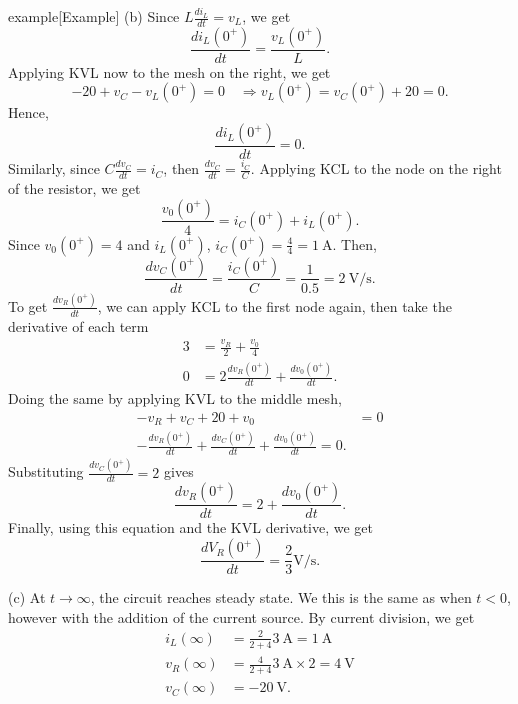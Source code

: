 \documentclass{article}
\begin{document}
\begin{callout}{example}[Example]
(b) Since $L \frac{d i_L}{d t}=v_L$, we get 
\[
    \frac{d i_L(0^+)}{d t}=\frac{v_L(0^+)}{L}.
\]
Applying KVL now to the mesh on the right, we get 
\[
    -20+v_C-v_L(0^+)=0\quad \Rightarrow v_L(0^+)=v_C(0^+)+20=0.
\]
Hence, 
\[
    \frac{d i_L(0^+)}{d t}=0.
\]
Similarly, since $C \frac{d v_C}{d t}=i_C$, then $\frac{d v_C}{d t}=\frac{i_C}{C}$. Applying KCL to the node on the right of the resistor, we get 
\[
    \frac{v_0(0^+)}{4}=i_C(0^+)+i_L(0^+).
\]
Since $v_0(0^+)=4$ and $i_L(0^+)$, $i_C(0^+)=\frac{4}{4}=\SI{1}{\ampere}$. Then, 
\[
    \frac{d v_C(0^+)}{d t}=\frac{i_C(0^+)}{C}=\frac{1}{0.5}=\SI{2}{\volt\per\second}.
\]
To get $\frac{d v_R(0^+)}{d t}$, we can apply KCL to the first node again, then take the derivative of each term
\begin{align*}
    3 &= \frac{v_R}{2}+\frac{v_0}{4}\\
    0&=2 \frac{d v_R(0^+)}{d t}+\frac{d v_0(0^+)}{d t}.
\end{align*}
Doing the same by applying KVL to the middle mesh,
\begin{align*}
    -v_R+v_C+20 +v_0&=0\\
    -\frac{d v_R(0^+)}{d t}+\frac{d v_C(0^+)}{d t}+\frac{d v_0(0^+)}{d t}=0.
\end{align*}
Substituting $\frac{d v_C(0^+)}{d t}=2$ gives 
\[
    \frac{d v_R(0^+)}{d t}=2+\frac{d v_0(0^+)}{d t}.
\]
Finally, using this equation and the KVL derivative, we get 
\[
    \frac{d V_R(0^+)}{d t}=\frac{2}{3}\unit{\volt\per\second}.
\]

(c) At $t \to \infty$, the circuit reaches steady state. We this is the same as when $t<0$, however with the addition of the current source. By current division, we get 
\begin{align*}
    i_L(\infty) &= \frac{2}{2+4}\SI{3}{\ampere}=\SI{1}{\ampere}\\
    v_R(\infty)&=\frac{4}{2+4}\SI{3}{\ampere}\times 2=\SI{4}{\volt}\\
    v_C(\infty)&=\SI{-20}{\volt}.
\end{align*}
\end{callout}
\end{document}
